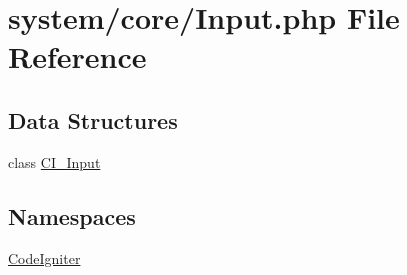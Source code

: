 \hypertarget{_input_8php}{}\section{system/core/\+Input.php File Reference}
\label{_input_8php}
\subsection*{Data Structures}
\begin{DoxyCompactItemize}
\item 
class \mbox{\hyperlink{class_c_i___input}{C\+I\+\_\+\+Input}}
\end{DoxyCompactItemize}
\subsection*{Namespaces}
\begin{DoxyCompactItemize}
\item 
 \mbox{\hyperlink{namespace_code_igniter}{Code\+Igniter}}
\end{DoxyCompactItemize}
